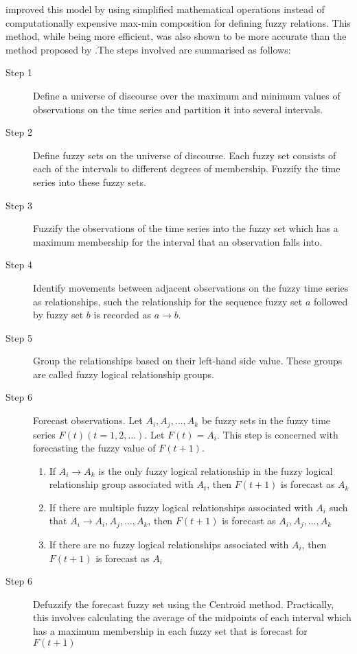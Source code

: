 \documentclass[12pt, oneside, a4paper]{article}
\theoremstyle{definition}
\begin{document}
\cite{chen1996forecasting} improved this model by using simplified mathematical operations instead of computationally expensive max-min composition for defining fuzzy relations. This method, while being more efficient, was also shown to be more accurate than the method proposed by \cite{song1993forecasting}.The steps involved are summarised as follows:

\begin{description}
\item[Step 1] Define a universe of discourse over the maximum and minimum values of observations on the time series and partition it into several intervals.
\item[Step 2] Define fuzzy sets on the universe of discourse. Each fuzzy set consists of each of the intervals to different degrees of membership. Fuzzify the time series into these fuzzy sets.
\item[Step 3] Fuzzify the observations of the time series into the fuzzy set which has a maximum membership for the interval that an observation falls into.
\item[Step 4] Identify movements between adjacent observations on the fuzzy time series as relationships, such the relationship for the sequence fuzzy set $a$ followed by fuzzy set $b$ is recorded as $a \rightarrow b$.
\item[Step 5] Group the relationships based on their left-hand side value. These groups are called fuzzy logical relationship groups.
\item[Step 6] Forecast observations. Let $A_{i}, A_{j}, \ldots, A_{k}$ be fuzzy sets in the fuzzy time series $F(t)(t=1,2,\ldots)$. Let $F(t) = A_{i}$. This step is concerned with forecasting the fuzzy value of $F(t+1)$.
\begin{enumerate}
\item If  $A_i \rightarrow A_k$ is the only fuzzy logical relationship in the fuzzy logical relationship group associated with $A_t$, then $F(t+1)$ is forecast as $A_k$ 
\item If there are multiple fuzzy logical relationships associated with $A_i$ such that $A_i \rightarrow A_{i}, A_{j}, \ldots, A_{k}$, then $F(t+1)$ is forecast as $A_{i}, A_{j}, \ldots, A_{k}$
\item If there are no fuzzy logical relationships associated with $A_i$, then $F(t+1)$ is forecast as $A_i$
\end{enumerate}
\item[Step 6] Defuzzify the forecast fuzzy set using the Centroid method. Practically, this involves calculating the average of the midpoints of each interval which has a maximum membership in each fuzzy set that is forecast for $F(t+1)$
\end{description}
\end{document}
